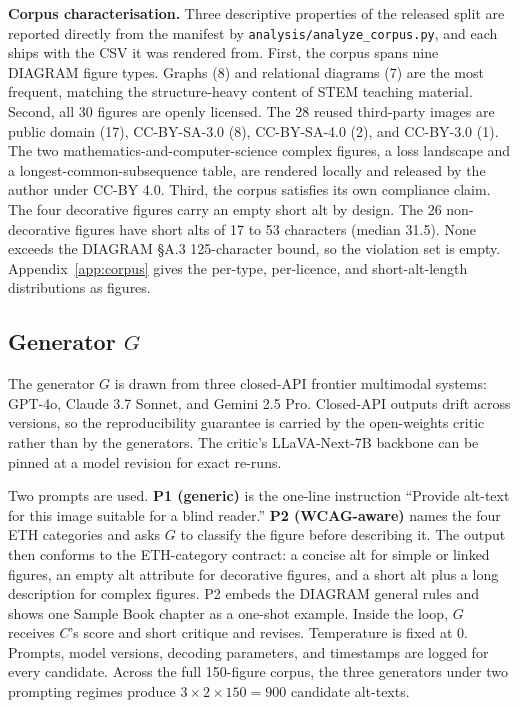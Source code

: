 \documentclass[pdflatex,sn-mathphys-num]{sn-jnl}
\begin{document}
\textbf{Corpus characterisation.} Three descriptive properties of the released split are reported directly from the manifest by \texttt{analysis/analyze\_corpus.py}, and each ships with the CSV it was rendered from. First, the corpus spans nine DIAGRAM figure types. Graphs (8) and relational diagrams (7) are the most frequent, matching the structure-heavy content of STEM teaching material. Second, all 30 figures are openly licensed. The 28 reused third-party images are public domain (17), CC-BY-SA-3.0 (8), CC-BY-SA-4.0 (2), and CC-BY-3.0 (1). The two mathematics-and-computer-science complex figures, a loss landscape and a longest-common-subsequence table, are rendered locally and released by the author under CC-BY 4.0. Third, the corpus satisfies its own compliance claim. The four decorative figures carry an empty short alt by design. The 26 non-decorative figures have short alts of 17 to 53 characters (median 31.5). None exceeds the DIAGRAM \S A.3 125-character bound, so the violation set is empty. Appendix~\ref{app:corpus} gives the per-type, per-licence, and short-alt-length distributions as figures.

\subsection{\texorpdfstring{Generator $G$}{Generator G}}\label{subsec:generator}

The generator $G$ is drawn from three closed-API frontier multimodal systems: GPT-4o, Claude 3.7 Sonnet, and Gemini 2.5 Pro. Closed-API outputs drift across versions, so the reproducibility guarantee is carried by the open-weights critic rather than by the generators. The critic's LLaVA-Next-7B backbone can be pinned at a model revision for exact re-runs.

Two prompts are used. \textbf{P1 (generic)} is the one-line instruction ``Provide alt-text for this image suitable for a blind reader.'' \textbf{P2 (WCAG-aware)} names the four ETH categories and asks $G$ to classify the figure before describing it. The output then conforms to the ETH-category contract: a concise alt for simple or linked figures, an empty alt attribute for decorative figures, and a short alt plus a long description for complex figures. P2 embeds the DIAGRAM general rules and shows one Sample Book chapter as a one-shot example. Inside the loop, $G$ receives $C$'s score and short critique and revises. Temperature is fixed at 0. Prompts, model versions, decoding parameters, and timestamps are logged for every candidate. Across the full 150-figure corpus, the three generators under two prompting regimes produce $3 \times 2 \times 150 = 900$ candidate alt-texts.
\end{document}
